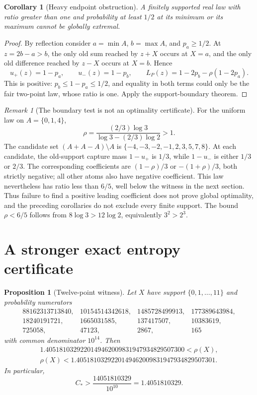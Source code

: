 \documentclass[11pt]{article}
\newtheorem{proposition}[theorem]{Proposition}
\newtheorem{corollary}[theorem]{Corollary}
\theoremstyle{remark}
\newtheorem{remark}[theorem]{Remark}
\begin{document}
\begin{corollary}[Heavy endpoint obstruction]\label{cor:heavy}
A finitely supported real law with ratio greater than one and probability
at least $1/2$ at its minimum or its maximum cannot be globally extremal.
\end{corollary}
\begin{proof}
By reflection consider $a=\min A$, $b=\max A$, and $p_a\geq1/2$.
At $z=2b-a>b$, the only old sum reached by $z+X$ occurs at $X=a$, and
the only old difference reached by $z-X$ occurs at $X=b$. Hence
\[
 u_+(z)=1-p_a,\qquad u_-(z)=1-p_b,
 \qquad L_P(z)=1-2p_b-\rho(1-2p_a).
\]
This is positive: $p_b\leq1-p_a\leq1/2$, and equality in both terms
could only be the fair two-point law, whose ratio is one. Apply the
support-boundary theorem.
\end{proof}

\begin{remark}[The boundary test is not an optimality certificate]
For the uniform law on $A=\{0,1,4\}$,
\[
 \rho=\frac{(2/3)\log3}{\log3-(2/3)\log2}>1.
\]
The candidate set $(A+A-A)\setminus A$ is
$\{-4,-3,-2,-1,2,3,5,7,8\}$. At each candidate, the old-support capture
mass $1-u_+$ is $1/3$, while $1-u_-$ is either $1/3$ or $2/3$.
The corresponding coefficients are $(1-\rho)/3$ or $-(1+\rho)/3$,
both strictly negative; all other atoms also have negative coefficient.
This law nevertheless has ratio less than $6/5$, well below the witness
in the next section. Thus failure to find a positive leading coefficient
does not prove global optimality, and the preceding corollaries do not
exclude every finite support. The bound $\rho<6/5$ follows from
$8\log3>12\log2$, equivalently $3^2>2^3$.
\end{remark}

\section{A stronger exact entropy certificate}

\begin{proposition}[Twelve-point witness]\label{prop:witness}
Let $X$ have support $\{0,1,\ldots,11\}$ and probability numerators
\[
\begin{array}{rrrr}
88162313713840,&10154514342618,&1485728499913,&177389643984,\\
18240191721,&1665031585,&137417507,&10383619,\\
725058,&47123,&2867,&165
\end{array}
\]
with common denominator $10^{14}$. Then
\begin{gather*}
1.4051810329220149462009831947934829507300<\rho(X),\\
\rho(X)<1.4051810329220149462009831947934829507301.
\end{gather*}
In particular,
\[
 C_*>\frac{14051810329}{10^{10}}=1.4051810329.
\]
\end{proposition}
\end{document}
